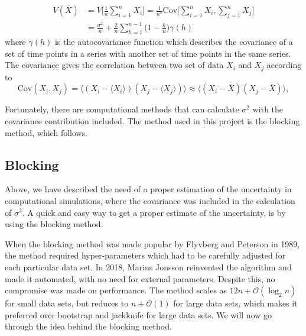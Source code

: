 \begin{equation}
\begin{aligned}
V(\overline{X})&=V\bigg[\frac{1}{n}\sum_{i=1}^nX_i\bigg]=\frac{1}{n^2}\text{Cov}\bigg[\sum_{i=1}^nX_i,\sum_{j=1}^nX_j\bigg]\\
&=\frac{\sigma^2}{n}+\frac{2}{n}\sum_{h=1}^{n-1}\Big(1-\frac{h}{n}\Big)\gamma(h)
\end{aligned}
\label{eq:samplevariance}
\end{equation}
where $\gamma(h)$ is the autocovariance function which describes the covariance of a set of time points in a series with another set of time points in the same series. The covariance gives the correlation between two set of data $X_i$ and $X_j$ according to
\begin{equation}
\text{Cov}(X_i,X_j)=\langle(X_i-\langle X_i\rangle)(X_j-\langle X_j\rangle)\rangle\approx \langle(X_i-\overline{X})(X_j-\overline{X})\rangle,
\end{equation}


Fortunately, there are computational methods that can
calculate $\sigma^2$ with the covariance contribution included. The method used in
this project is the blocking method, which follows.

\subsection{Blocking}\label{sec:resampling}
Above, we have described the need of a proper estimation of the uncertainty in computational simulations, where the covariance was included in
the calculation of $\sigma^2$. A quick and easy way to get a proper estimate of the uncertainty, is by using the blocking method.

When the blocking method was made popular by Flyvberg and Peterson in 1989, the method required hyper-parameters which had to be carefully adjusted for each particular data set. \cite{flyvbjerg_error_1989} In 2018, Marius Jonsson reinvented the algorithm and made it automated, with no need for external parameters. Despite this, no compromise was made on performance. The method scales as $12n+\mathcal{O}(\log_2n)$ for small data sets, but reduces to $n+\mathcal{O}(1)$ for large data sets, which makes it preferred over bootstrap and jackknife for large data sets. \cite{jonsson_standard_2018} We will now go through the idea behind the blocking method.

